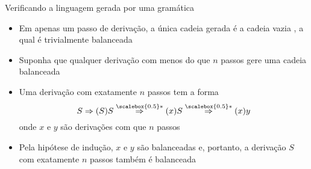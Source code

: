 \begin{frame}[fragile]{Verificando a linguagem gerada por uma gramática}

    \begin{itemize}
        \item Em apenas um passo de derivação, a única cadeia gerada é a cadeia vazia , a qual é trivialmente balanceada
        \pause

        \item Suponha que qualquer derivação com menos do que $n$ passos gere uma cadeia balanceada
        \pause

        \item Uma derivação com exatamente $n$ passos tem a forma
        \[
            S\Rightarrow (S)S \overset{\scalebox{0.5}*}{\Rightarrow} (x)S \overset{\scalebox{0.5}*}{\Rightarrow} (x)y
        \]
        onde $x$ e $y$ são derivações com que $n$ passos
        \pause

        \item Pela hipótese de indução, $x$ e $y$ são balanceadas e, portanto, a derivação $S$ com exatamente $n$ passos também é balanceada
    \end{itemize}

\end{frame}

